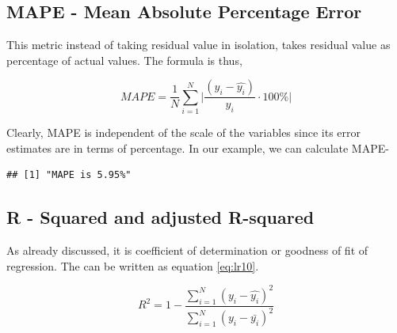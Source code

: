 \documentclass[
]{book}
\newenvironment{Shaded}{\begin{snugshade}}{\end{snugshade}}
\newcommand{\CommentTok}[1]{\textcolor[rgb]{0.56,0.35,0.01}{\textit{#1}}}
\newcommand{\DecValTok}[1]{\textcolor[rgb]{0.00,0.00,0.81}{#1}}
\newcommand{\FunctionTok}[1]{\textcolor[rgb]{0.13,0.29,0.53}{\textbf{#1}}}
\newcommand{\NormalTok}[1]{#1}
\newcommand{\SpecialCharTok}[1]{\textcolor[rgb]{0.81,0.36,0.00}{\textbf{#1}}}
\newcommand{\StringTok}[1]{\textcolor[rgb]{0.31,0.60,0.02}{#1}}
\begin{document}
\hypertarget{mape---mean-absolute-percentage-error}{%
\subsection{MAPE - Mean Absolute Percentage Error}\label{mape---mean-absolute-percentage-error}}

This metric instead of taking residual value in isolation, takes residual value as percentage of actual values. The formula is thus,

\begin{equation} 
{MAPE} = \frac{1}{N}\sum_{i = 1}^{N}{\lvert}\frac{({y_i - \hat{y_i}})}{y_i}\cdot{100}\%{\rvert}
\label{eq:lr9}
\end{equation}

Clearly, MAPE is independent of the scale of the variables since its error estimates are in terms of percentage. In our example, we can calculate MAPE-

\begin{Shaded}
\end{Shaded}

\begin{verbatim}
## [1] "MAPE is 5.95%"
\end{verbatim}

\hypertarget{r---squared-and-adjusted-r-squared}{%
\subsection{R - Squared and adjusted R-squared}\label{r---squared-and-adjusted-r-squared}}

As already discussed, it is coefficient of determination or goodness of fit of regression. The can be written as equation \eqref{eq:lr10}.

\begin{equation} 
R^2 = 1 - \frac{\sum_{i=1}^{N}(y_i - \hat{y_i})^2}{\sum_{i=1}^{N}(y_i - \bar{y_i})^2}
\label{eq:lr10}
\end{equation}
\end{document}
